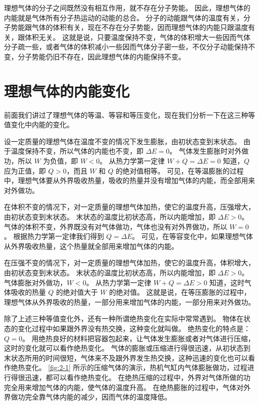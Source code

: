 理想气体的分子之间既然没有相互作用，就不存在分子势能。
因此，理想气体的内能就是气体所有分子热运动的动能的总合。
分子的动能跟气体的温度有关，分子势能跟气体的体积有关，现在不存在分子势能，因而理想气体的内能只跟温度有关，跟体积无关。
这就是说，只要温度保持不变，气体的体积增大一些因而气体分子疏一些，或者气体的体积减小一些因而气体分子密一些，不仅分子动能保持不变，分子势能仍旧不存在，因此理想气体的内能保持不变。

\section{理想气体的内能变化}
前面我们讲过了理想气体的等温、等容和等压变化，现在我们分析一下在这三种等值变化中内能的变化。

设一定质量的理想气体在温度不变的情况下发生膨胀，由初状态变到末状态。
由于温度保持不变，所以气体的内能也不变，即 $\Delta E=0$。
气体发生膨胀时对外做功，所以 $W$ 为负值，即 $W<0$。
从热力学第一定律 $W+Q=\Delta E=0$ 知道，$Q$ 应为正值，即 $Q>0$，而且 $W$ 和 $Q$ 的绝对值相等。
可见，在等温膨胀的过程中，理想气体要从外界吸收热量，吸收的热量并没有增加气体的内能，而全部用来对外做功。

在体积不变的情况下，对一定质量的理想气体加热，使它的温度升高，压强增大，由初状态变到末状态。
末状态的温度比初状态高，所以内能增加，即 $\Delta E>0$。
气体的体积不变，外界既没有对气体做功，气体也没有对外界做功，所以 $W=0$。
根据热力学第一定律我们得到 $Q=\Delta E$。
可见，在等容变化中，如果理想气体从外界吸收热量，这个热量就全部用来增加气体的内能。

在压强不变的情况下，对一定质量的理想气体加热，使它的温度升高，体积增大，由初状态变到末状态。
末状态的温度比初状态高，所以内能增加，即 $\Delta E>0$。
气体膨胀对外做功，$W<0$。
从热力学第一定律 $W+Q=\Delta E>0$ 知道，这时气体吸收的热量 $Q$ 的绝对值大于 $W$ 的绝对值。
这就是说，在等压膨胀的过程中，理想气体从外界吸收的热量，一部分用来增加气体的内能，一部分用来对外做功。

除了上述三种等值变化外，还有一种所谓绝热变化在实际中常常遇到。
物体在状态的变化过程中如果跟外界没有热交换，这种变化就叫做。
绝热变化的特点是：$Q=0$。
用绝热良好的材料把容器包起来，让气体发生膨胀或者对气体进行压缩，这时的变化就可以看作绝热变化。
气体的膨胀或压缩进行得很迅速，从初状态到末状态所用的时间很短，气体来不及跟外界发生热交换，这种迅速的变化也可以看作绝热变化。
\cref{fig:2-1} 所示的压缩气体的演示，热机气缸内气体膨胀做功，过程进行得很迅速，都可以看作绝热变化。
在绝热压缩的过程中，外界对气体所做的功完全用来增加气体的内能，使气体的温度升高。
在绝热膨胀的过程中，气体对外界做功完全靠气体内能的减少，因而气体的温度降低。

